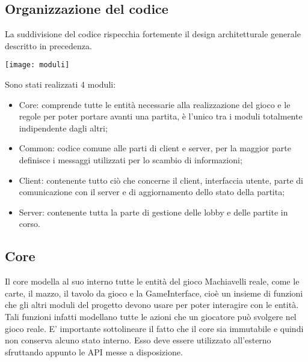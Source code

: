 \subsection{Organizzazione del codice}
La suddivisione del codice rispecchia fortemente il design architetturale generale descritto in precedenza.
\begin{center}
    \texttt{[image: moduli]}
\end{center}
Sono stati realizzati 4 moduli:
\begin{itemize}
    \item Core: comprende tutte le entità necessarie alla realizzazione del gioco e le regole per poter portare avanti una partita, è l’unico tra i moduli totalmente indipendente dagli altri;
    \item Common: codice comune alle parti di client e server, per la maggior parte definisce i messaggi utilizzati per lo scambio di informazioni;
    \item Client: contenente tutto ciò che concerne il client, interfaccia utente, parte di comunicazione con il server e di aggiornamento dello stato della partita;
    \item Server: contenente tutta la parte di gestione delle lobby e delle partite in corso.
\end{itemize}

\subsection{Core}
Il core modella al suo interno tutte le entità del gioco Machiavelli reale, come le carte, il mazzo, il tavolo da gioco e la GameInterface, cioè un insieme di funzioni che gli altri moduli del progetto devono usare per poter interagire con le entità. Tali funzioni infatti modellano tutte le azioni che un giocatore può svolgere nel gioco reale.
\newline
E’ importante sottolineare il fatto che il core sia immutabile e quindi non conserva alcuno stato interno. Esso deve essere utilizzato all’esterno sfruttando appunto le API messe a disposizione.

